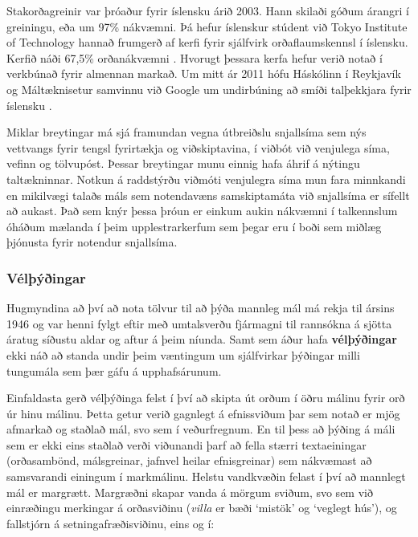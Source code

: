 \documentclass{../../metanetpaper}
\begin{document}
\begin{multicols}{2}
Stakorðagreinir var þróaður fyrir íslensku árið 2003. Hann skilaði góðum árangri í greiningu, eða um 97\% nákvæmni. Þá hefur íslenskur stúdent við Tokyo Institute of Technology hannað frumgerð af kerfi fyrir sjálfvirk orðaflaumskennsl í íslensku. Kerfið náði 67,5\% orðanákvæmni \cite{hind1}. Hvorugt þessara kerfa hefur verið notað í verkbúnað fyrir almennan markað. Um mitt ár 2011 hófu Háskólinn í Reykjavík og Máltæknisetur samvinnu við Google um undirbúning að smíði talþekkjara fyrir íslensku \cite{alm1}.

Miklar breytingar má sjá framundan vegna útbreiðslu snjallsíma sem nýs vettvangs fyrir tengsl fyrirtækja og viðskiptavina, í viðbót við venjulega síma, vefinn og tölvupóst. Þessar breytingar munu einnig hafa áhrif á nýtingu taltækninnar. Notkun á raddstýrðu viðmóti venjulegra síma mun fara minnkandi en mikilvægi talaðs máls sem notendavæns samskiptamáta við snjallsíma er sífellt að aukast. Það sem knýr þessa þróun er einkum aukin nákvæmni í talkennslum óháðum mælanda í þeim upplestrarkerfum sem þegar eru í boði sem miðlæg þjónusta fyrir notendur snjallsíma.

\subsubsection{Vélþýðingar}

Hugmyndina að því að nota tölvur til að þýða mannleg mál má rekja til ársins 1946 og var henni fylgt eftir með umtalsverðu fjármagni til rannsókna á sjötta áratug síðustu aldar og aftur á þeim níunda. Samt sem áður hafa \textbf{vélþýðingar} ekki náð að standa undir þeim væntingum um sjálfvirkar þýðingar milli tungumála sem þær gáfu á upphafsárunum.


Einfaldasta gerð vélþýðinga felst í því að skipta út orðum í öðru málinu fyrir orð úr hinu málinu. Þetta getur verið gagnlegt á efnissviðum þar sem notað er mjög afmarkað og staðlað mál, svo sem í veðurfregnum. En til þess að þýðing á máli sem er ekki eins staðlað verði viðunandi þarf að fella stærri textaeiningar (orðasambönd, málsgreinar, jafnvel heilar efnisgreinar) sem nákvæmast að samsvarandi einingum í markmálinu. Helstu vandkvæðin felast í því að mannlegt mál er margrætt. Margræðni skapar vanda á mörgum sviðum, svo sem við einræðingu merkingar á orðasviðinu (\textit{villa} er bæði ‘mistök’ og ‘veglegt hús’), og fallstjórn á setningafræðisviðinu, eins og í:


\end{multicols}
\end{document}
